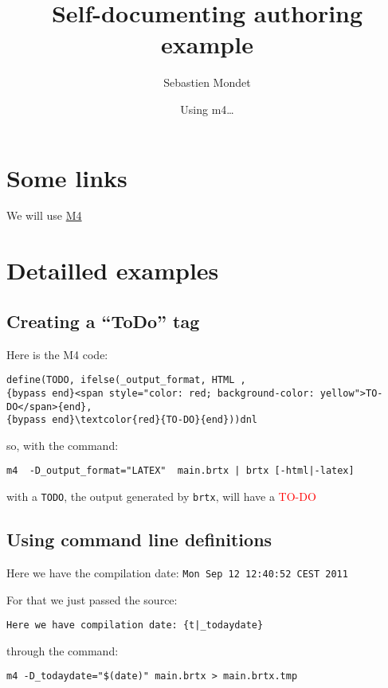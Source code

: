 \documentclass[a4paper,10pt]{article}
\begin{document}
\date{}\title{Self-{}documenting authoring example}
\author{Sebastien Mondet}
\date{Using m4\ldots{}}
\maketitle


  
\section{Some links}
\label{seclinks}
  We will use \href{http://en.wikipedia.org/wiki/M4_(computer_language)}{M4}   
\section{Detailled examples}
\label{secexamples}
  
\subsection{Creating a ``ToDo'' tag}
\label{secdeftodo}
    Here is the M4 code: %
\begin{verbatim}
define(TODO, ifelse(_output_format, HTML ,
{bypass end}<span style="color: red; background-color: yellow">TO-DO</span>{end},
{bypass end}\textcolor{red}{TO-DO}{end}))dnl
\end{verbatim}
 so, with the command: %
\begin{verbatim}
m4  -D_output_format="LATEX"  main.brtx | brtx [-html|-latex]
\end{verbatim}
 with a \texttt{TODO}, the output generated by \texttt{brtx}, will have a \textcolor{red}{TO-DO}    
\subsection{Using command line definitions}
\label{secdatecommand}
  Here we have the compilation date: \texttt{Mon Sep 12 12:40:52 CEST 2011} \par{}
 For that we just passed the source: %
\begin{verbatim}
Here we have compilation date: {t|_todaydate}
\end{verbatim}
 through the command: %
\begin{verbatim}
m4 -D_todaydate="$(date)" main.brtx > main.brtx.tmp
\end{verbatim}
  
\end{document}

